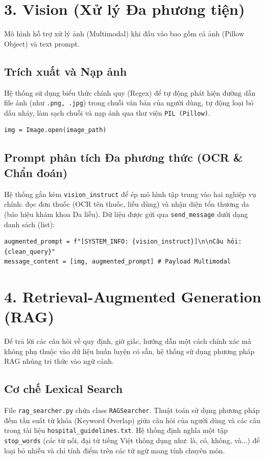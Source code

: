 \documentclass[12pt]{article}
\begin{document}
\section{3. Vision (Xử lý Đa phương tiện)}
Mô hình hỗ trợ xử lý ảnh (Multimodal) khi đầu vào bao gồm cả ảnh (Pillow Object) và text prompt.

\subsection{Trích xuất và Nạp ảnh}
Hệ thống sử dụng biểu thức chính quy (Regex) để tự động phát hiện đường dẫn file ảnh (như \texttt{.png, .jpg}) trong chuỗi văn bản của người dùng, tự động loại bỏ dấu nháy, làm sạch chuỗi và nạp ảnh qua thư viện \texttt{PIL (Pillow)}.

\begin{mdframed}[backgroundcolor=gray!10]
\begin{verbatim}
img = Image.open(image_path)
\end{verbatim}
\end{mdframed}

\subsection{Prompt phân tích Đa phương thức (OCR \& Chẩn đoán)}
Hệ thống gắn kèm \texttt{vision\_instruct} để ép mô hình tập trung vào hai nghiệp vụ chính: đọc đơn thuốc (OCR tên thuốc, liều dùng) và nhận diện tổn thương da (báo hiệu khám khoa Da liễu). Dữ liệu được gửi qua \texttt{send\_message} dưới dạng danh sách (list):

\begin{mdframed}[backgroundcolor=gray!10]
\begin{verbatim}
augmented_prompt = f"[SYSTEM_INFO: {vision_instruct}]\n\nCâu hỏi: {clean_query}"
message_content = [img, augmented_prompt] # Payload Multimodal
\end{verbatim}
\end{mdframed}

\section{4. Retrieval-Augmented Generation (RAG)}
Để trả lời các câu hỏi về quy định, giờ giấc, hướng dẫn một cách chính xác mà không phụ thuộc vào dữ liệu huấn luyện có sẵn, hệ thống sử dụng phương pháp RAG nhúng tri thức vào ngữ cảnh.

\subsection{Cơ chế Lexical Search}
File \texttt{rag\_searcher.py} chứa class \texttt{RAGSearcher}. Thuật toán sử dụng phương pháp đếm tần suất từ khóa (Keyword Overlap) giữa câu hỏi của người dùng và các câu trong tài liệu \texttt{hospital\_guidelines.txt}. Hệ thống định nghĩa một tập \texttt{stop\_words} (các từ nối, đại từ tiếng Việt thông dụng như: là, có, không, và...) để loại bỏ nhiễu và chỉ tính điểm trên các từ ngữ mang tính chuyên môn.
\end{document}
